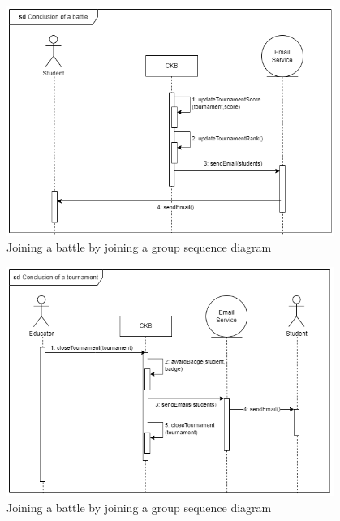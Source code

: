 \begin{figure}[H]
    \centering
    \includegraphics[width=0.95\textwidth]{images/seq_diagrams/battle_conclusion.png}
    \caption{Joining a battle by joining a group sequence diagram}
    \label{fig:sequence_diagram}
\end{figure}
\clearpage

\begin{figure}[H]
    \centering
    \includegraphics[width=0.95\textwidth]{images/seq_diagrams/tournament_conclusion.png}
    \caption{Joining a battle by joining a group sequence diagram}
    \label{fig:sequence_diagram}
\end{figure}
\clearpage


